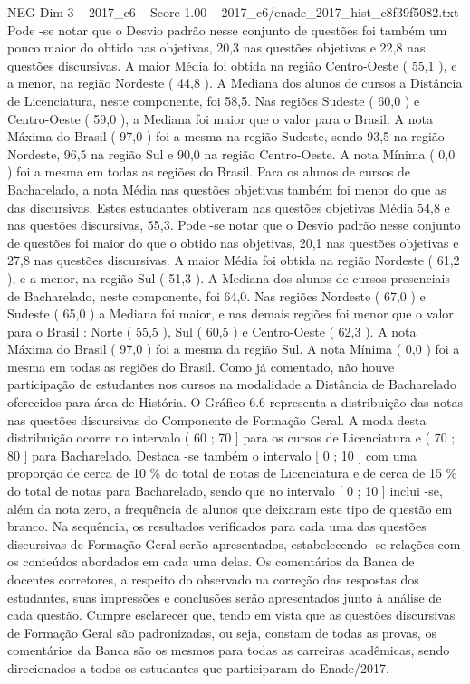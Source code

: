 \begin{textsample}{NEG Dim 3 – 2017\_c6 – Score 1.00 – 2017\_c6/enade\_2017\_hist\_c8f39f5082.txt}
Pode -se notar que o Desvio padrão nesse conjunto de questões foi também um pouco maior do obtido nas objetivas, 20,3 nas questões objetivas e 22,8 nas questões discursivas.
A maior Média foi obtida na região Centro-Oeste ( 55,1 ), e a menor, na região Nordeste ( 44,8 ).
A Mediana dos alunos de cursos a Distância de Licenciatura, neste componente, foi 58,5.
Nas regiões Sudeste ( 60,0 ) e Centro-Oeste ( 59,0 ), a Mediana foi maior que o valor para o Brasil.
A nota Máxima do Brasil ( 97,0 ) foi a mesma na região Sudeste, sendo 93,5 na região Nordeste, 96,5 na região Sul e 90,0 na região Centro-Oeste.
A nota Mínima ( 0,0 ) foi a mesma em todas as regiões do Brasil.
Para os alunos de cursos de Bacharelado, a nota Média nas questões objetivas também foi menor do que as das discursivas.
Estes estudantes obtiveram nas questões objetivas Média 54,8 e nas questões discursivas, 55,3.
Pode -se notar que o Desvio padrão nesse conjunto de questões foi maior do que o obtido nas objetivas, 20,1 nas questões objetivas e 27,8 nas questões discursivas.
A maior Média foi obtida na região Nordeste ( 61,2 ), e a menor, na região Sul ( 51,3 ).
A Mediana dos alunos de cursos presenciais de Bacharelado, neste componente, foi 64,0.
Nas regiões Nordeste ( 67,0 ) e Sudeste ( 65,0 ) a Mediana foi maior, e nas demais regiões foi menor que o valor para o Brasil : Norte ( 55,5 ), Sul ( 60,5 ) e Centro-Oeste ( 62,3 ).
A nota Máxima do Brasil ( 97,0 ) foi a mesma da região Sul.
A nota Mínima ( 0,0 ) foi a mesma em todas as regiões do Brasil.
Como já comentado, não houve participação de estudantes nos cursos na modalidade a Distância de Bacharelado oferecidos para área de História.
O Gráfico 6.6 representa a distribuição das notas nas questões discursivas do Componente de Formação Geral.
A moda desta distribuição ocorre no intervalo ( 60 ; 70 ] para os cursos de Licenciatura e ( 70 ; 80 ] para Bacharelado.
Destaca -se também o intervalo [ 0 ; 10 ] com uma proporção de cerca de 10 \% do total de notas de Licenciatura e de cerca de 15 \% do total de notas para Bacharelado, sendo que no intervalo [ 0 ; 10 ] inclui -se, além da nota zero, a frequência de alunos que deixaram este tipo de questão em branco.
Na sequência, os resultados verificados para cada uma das questões discursivas de Formação Geral serão apresentados, estabelecendo -se relações com os conteúdos abordados em cada uma delas.
Os comentários da Banca de docentes corretores, a respeito do observado na correção das respostas dos estudantes, suas impressões e conclusões serão apresentados junto à análise de cada questão.
Cumpre esclarecer que, tendo em vista que as questões discursivas de Formação Geral são padronizadas, ou seja, constam de todas as provas, os comentários da Banca são os mesmos para todas as carreiras acadêmicas, sendo direcionados a todos os estudantes que participaram do Enade/2017.

\end{textsample}
